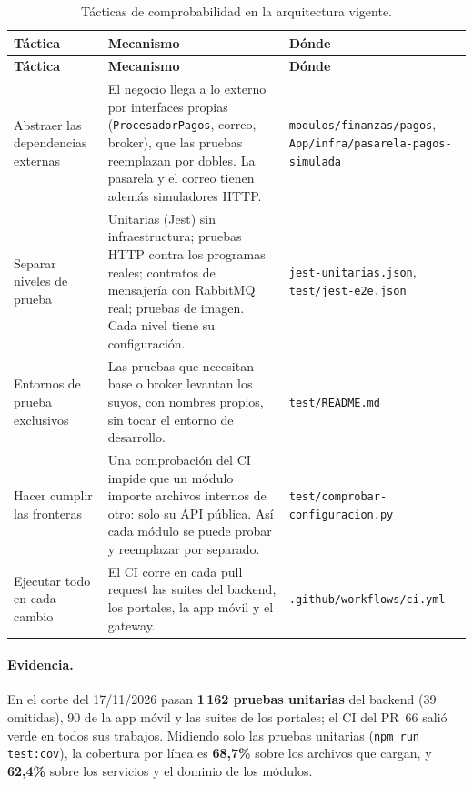 \begin{center}
\begin{longtable}{|>{\raggedright\arraybackslash}p{2.8cm}|>{\raggedright\arraybackslash}p{6.7cm}|>{\raggedright\arraybackslash}p{3.8cm}|}
\caption{Tácticas de comprobabilidad en la arquitectura vigente.}\label{tab:comprobabilidad-vigente}\\
\hline
\textbf{Táctica} & \textbf{Mecanismo} & \textbf{Dónde}\\
\hline
\endfirsthead
\hline
\textbf{Táctica} & \textbf{Mecanismo} & \textbf{Dónde}\\
\hline
\endhead
Abstraer las dependencias externas &
El negocio llega a lo externo por interfaces propias (\texttt{ProcesadorPagos}, correo, broker), que
las pruebas reemplazan por dobles. La pasarela y el correo tienen además simuladores HTTP. &
\texttt{modulos/\allowbreak finanzas/\allowbreak pagos}, \texttt{App/infra/\allowbreak pasarela-pagos-\allowbreak simulada}\\
\hline
Separar niveles de prueba &
Unitarias (Jest) sin infraestructura; pruebas HTTP contra los programas reales; contratos de
mensajería con RabbitMQ real; pruebas de imagen. Cada nivel tiene su configuración. &
\texttt{jest-\allowbreak unitarias.json}, \texttt{test/\allowbreak jest-e2e.json}\\
\hline
Entornos de prueba exclusivos &
Las pruebas que necesitan base o broker levantan los suyos, con nombres propios, sin tocar el
entorno de desarrollo. &
\texttt{test/README.md}\\
\hline
Hacer cumplir las fronteras &
Una comprobación del CI impide que un módulo importe archivos internos de otro: solo su API
pública. Así cada módulo se puede probar y reemplazar por separado. &
\texttt{test/\allowbreak comprobar-\allowbreak configuracion.py}\\
\hline
Ejecutar todo en cada cambio &
El CI corre en cada pull request las suites del backend, los portales, la app móvil y el gateway. &
\texttt{.github/\allowbreak workflows/\allowbreak ci.yml}\\
\hline
\end{longtable}
\end{center}

\paragraph{Evidencia.} En el corte del 17/11/2026 pasan \textbf{1\,162 pruebas unitarias} del
backend (39 omitidas), 90 de la app móvil y las suites de los portales; el CI del PR~66 salió
verde en todos sus trabajos. Midiendo solo las pruebas unitarias
(\texttt{npm run test:cov}), la cobertura por línea es \textbf{68,7\%} sobre los archivos que
cargan, y \textbf{62,4\%} sobre los servicios y el dominio de los módulos.

